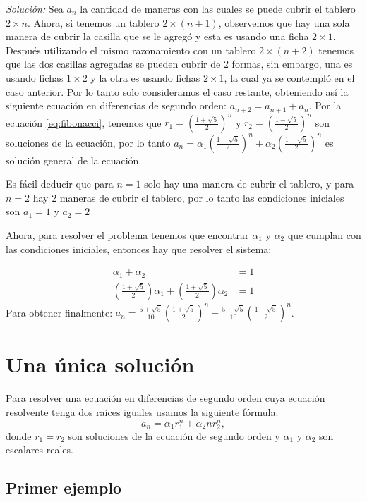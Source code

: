 \documentclass{report}
\begin{document}
\textit{Solución:} Sea $a_n$ la cantidad de maneras con las cuales se
puede cubrir el tablero $2\times n$. Ahora, si tenemos un tablero
$2\times (n+1)$, observemos que hay una sola manera de cubrir la
casilla que se le agregó y esta es usando una ficha $2\times 1$.
Después utilizando el mismo razonamiento con un tablero
$2\times (n+2)$ tenemos que las dos casillas agregadas se pueden
cubrir de 2 formas, sin embargo, una es usando fichas $1\times 2$ y la
otra es usando fichas $2\times 1$, la cual ya se contempló en el caso
anterior. Por lo tanto solo consideramos el caso restante, obteniendo
así la siguiente ecuación en diferencias de segundo orden:
$a_{n+2}=a_{n+1}+a_n$. Por la ecuación \eqref{eq:fibonacci}, tenemos
que $r_1=(\frac{1+\sqrt{5}}{2})^n$ y $r_2=(\frac{1-\sqrt{5}}{2})^n$
son soluciones de la ecuación, por lo tanto
$a_n=\alpha_1(\frac{1+\sqrt{5}}{2})^n +
\alpha_2(\frac{1-\sqrt{5}}{2})^n$ es solución general de la ecuación.


Es fácil deducir que para $n=1$ solo hay una manera de cubrir el
tablero, y para $n=2$ hay 2 maneras de cubrir el tablero, por lo tanto
las condiciones iniciales son $a_1=1$ y $a_2=2$

Ahora, para resolver el problema tenemos que encontrar $\alpha_1$ y
$\alpha_2$ que cumplan con las condiciones iniciales, entonces hay que
resolver el sistema:

\begin{align*}
\alpha_{1} + \alpha_{2} &= 1\\
(\frac{1+\sqrt{5}}{2})\alpha_{1} + (\frac{1+\sqrt{5}}{2})\alpha_{2}&=1
\end{align*}
Para obtener finalmente:
$a_{n}= \frac{5+\sqrt{5}}{10}(\frac{1+\sqrt{5}}{2})^n +
\frac{5-\sqrt{5}}{10}(\frac{1-\sqrt{5}}{2})^n$.

\section{Una única solución}
\label{sec:unica}

Para resolver una ecuación en diferencias de segundo orden cuya
ecuación resolvente tenga dos raíces iguales usamos la siguiente fórmula:
\begin{equation}
 \label{raicesiguales}
 a_n=\alpha_1r_1^n +\alpha_2nr_2^n,
\end{equation}
donde $r_1=r_2$ son soluciones de la ecuación de segundo orden y
$\alpha_1$ y $\alpha_2$ son escalares reales.

\subsection{Primer ejemplo}
\end{document}
